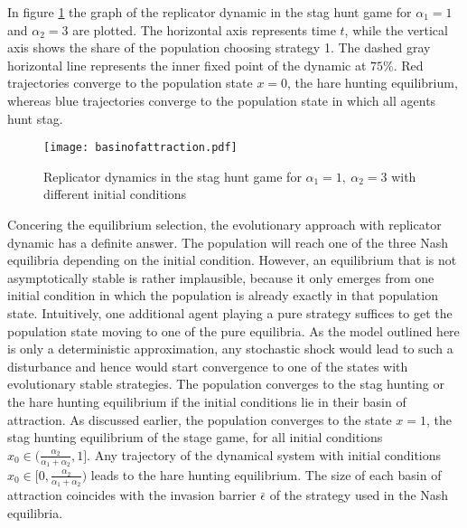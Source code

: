 In figure \ref{fig:basinofattraction} the graph of the replicator dynamic
in the stag hunt game for $\alpha_1=1$ and $\alpha_2=3$ are plotted. The
horizontal axis represents time $t$, while the vertical axis shows
the share of the population choosing strategy 1. The dashed gray horizontal
line represents the inner fixed point of the dynamic at $75\%$.
Red trajectories converge to the population state $x=0$, the hare hunting
equilibrium, whereas blue trajectories converge to the population state in 
which all agents hunt stag.
\begin{figure}
 \centering
        \texttt{[image: basinofattraction.pdf]}
        \caption[Replicator dynamic of the stag hunt game]{Replicator dynamics in the stag hunt game for 
                $\alpha_1=1,\ \alpha_2=3$ with different initial conditions}
                \label{fig:basinofattraction}
\end{figure}

Concering the equilibrium selection, the evolutionary approach with replicator
dynamic has a definite answer. The population will reach one of the three
Nash equilibria depending on the initial condition. 
However, an equilibrium that is not asymptotically stable 
is rather implausible,
because it only emerges from one initial condition in which the population
is already exactly in that population state. 
Intuitively, one additional agent playing
a pure strategy suffices to get the population state moving to one of the
pure equilibria. As the model outlined here is only a deterministic
approximation, any stochastic shock would lead to such a disturbance and hence
would start convergence to one of the states with evolutionary stable 
strategies.
The population converges to the stag hunting or the hare
hunting equilibrium if the initial conditions lie in their 
basin of attraction.
As discussed earlier, the population converges to the state $x=1$, 
the stag hunting equilibrium of the stage game, for all initial conditions 
$x_0 \in (\frac{\alpha_2}{\alpha_1+\alpha_2},1]$. Any trajectory of the 
dynamical system with initial conditions 
$x_0 \in [0,\frac{\alpha_2}{\alpha_1+\alpha_2})$ leads to the hare hunting
equilibrium. The size of each basin of attraction coincides with the invasion 
barrier $\bar{\epsilon}$ of the strategy used in the Nash equilibria.


